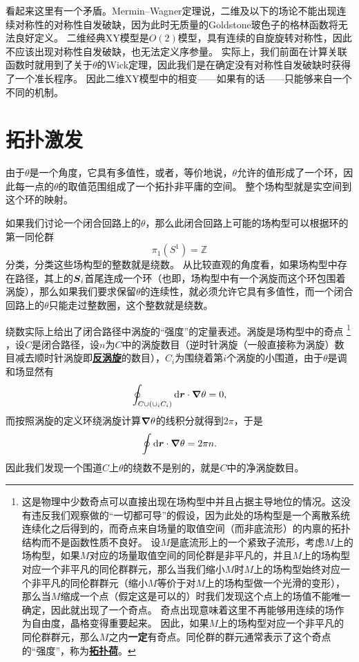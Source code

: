 \documentclass[hyperref, UTF8, a4paper]{ctexart}
\renewcommand{\emph}[1]{\textbf{#1}}
\newcommand*{\concept}[1]{\underline{\textbf{#1}}}
\begin{document}
看起来这里有一个矛盾。Mermin–Wagner定理说，二维及以下的场论不能出现连续对称性的对称性自发破缺，因为此时无质量的Goldstone玻色子的格林函数将无法良好定义。
二维经典XY模型是$O(2)$模型，具有连续的自旋旋转对称性，因此不应该出现对称性自发破缺，也无法定义序参量。
实际上，我们前面在计算关联函数时就用到了关于$\theta$的Wick定理，因此我们是在确定没有对称性自发破缺时获得了一个准长程序。
因此二维XY模型中的相变——如果有的话——只能够来自一个不同的机制。

\section{拓扑激发}

由于$\theta$是一个角度，它具有多值性，或者，等价地说，$\theta$允许的值形成了一个环，因此每一点的$\theta$的取值范围组成了一个拓扑非平庸的空间。
整个场构型就是实空间到这个环的映射。

如果我们讨论一个闭合回路上的$\theta$，那么此闭合回路上可能的场构型可以根据环的第一同伦群
\[
    \pi_1(S^1) = \mathbb{Z}
\]
分类，分类这些场构型的整数就是绕数。
从比较直观的角度看，如果场构型中存在路径，其上的$\vb*{S}_i$首尾连成一个环（也即，场构型中有一个涡旋而这个环包围着涡旋），那么如果我们要求保留$\theta$的连续性，就必须允许它具有多值性，而一个闭合回路上的$\theta$只能走过整数圈，这个整数就是绕数。

绕数实际上给出了闭合路径中涡旋的“强度”的定量表述。涡旋是场构型中的奇点%
\footnote{
    这是物理中少数奇点可以直接出现在场构型中并且占据主导地位的情况。这没有违反我们观察做的“一切都可导”的假设，因为此处的场构型是一个离散系统连续化之后得到的，而奇点来自场量的取值空间（而非底流形）的内禀的拓扑结构而不是函数性质不良好。
    设$M$是底流形上的一个紧致子流形，考虑$M$上的场构型，如果$M$对应的场量取值空间的同伦群是非平凡的，并且$M$上的场构型对应一个非平凡的同伦群群元，那么当我们缩小$M$时$M$上的场构型始终对应一个非平凡的同伦群群元（缩小$M$等价于对$M$上的场构型做一个光滑的变形），那么当$M$缩成一个点（假定这是可以的）时我们发现这个点上的场值不能唯一确定，因此就出现了一个奇点。
    奇点出现意味着这里不再能够用连续的场作为自由度，晶格变得重要起来。
    因此，如果$M$上的场构型对应一个非平凡的同伦群群元，那么$M$之内\emph{一定}有奇点。同伦群的群元通常表示了这个奇点的“强度”，称为\concept{拓扑荷}。
}%
，设$C$是闭合路径，设$n$为$C$中的涡旋数目（逆时针涡旋（一般直接称为涡旋）数目减去顺时针涡旋即\concept{反涡旋}的数目），$C_i$为围绕着第$i$个涡旋的小围道，由于$\theta$是调和场显然有
\[
    \oint_{C \cup ( \cup_i C_i)} \dd{\vb*{r}} \cdot \grad{\theta} = 0,
\]
而按照涡旋的定义环绕涡旋计算$\grad{\theta}$的线积分就得到$2\pi$，于是
\begin{equation}
    \oint \dd{\vb*{r}} \cdot \grad{\theta} = 2 \pi n.
\end{equation}
因此我们发现一个围道$C$上$\theta$的绕数不是别的，就是$C$中的净涡旋数目。
\end{document}
